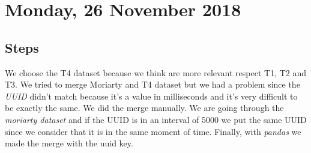 \section{Monday, 26 November 2018}

\subsection{Steps}
We choose the T4 dataset because we think are more relevant respect T1, T2 and T3. We tried to merge Moriarty and T4 dataset but we had a problem since the \textit{UUID} didn't match because it's a value in milliseconds and it's very difficult to be exactly the same.
We did the merge manually. We are going through the\textit{ moriarty dataset} and if the UUID is in an interval of 5000 we put the same UUID since we consider that it is in the same moment of time. Finally, with \textit{pandas} we made the merge with the uuid key.

